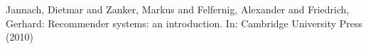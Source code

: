 \documentclass[runningheads,a4paper]{llncs}
\begin{document}
\begin{thebibliography}{4}
 Jannach, Dietmar and Zanker, Markus and Felfernig, Alexander and Friedrich, Gerhard: 
Recommender systems: an introduction. In: Cambridge University Press (2010)







\end{thebibliography}
\end{document}
